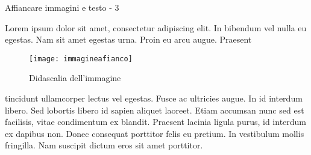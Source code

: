 \begin{frame}{Affiancare immagini e testo - 3}

Lorem ipsum dolor sit amet, consectetur adipiscing elit. In bibendum vel nulla
eu egestas. Nam sit amet egestas urna. Proin eu arcu augue. Praesent
\begin{wrapfigure}{r}{5cm}
    \texttt{[image: immagineafianco]}
    \caption{Didascalia dell'immagine}
\end{wrapfigure} 
tincidunt ullamcorper lectus vel egestas. Fusce ac ultricies augue. In id
interdum libero. Sed lobortis libero id sapien aliquet laoreet. Etiam accumsan
nunc sed est facilisis, vitae condimentum ex blandit. Praesent lacinia ligula
purus, id interdum ex dapibus non. Donec consequat porttitor felis eu pretium.
In vestibulum mollis fringilla. Nam suscipit dictum eros sit amet porttitor.

\end{frame}